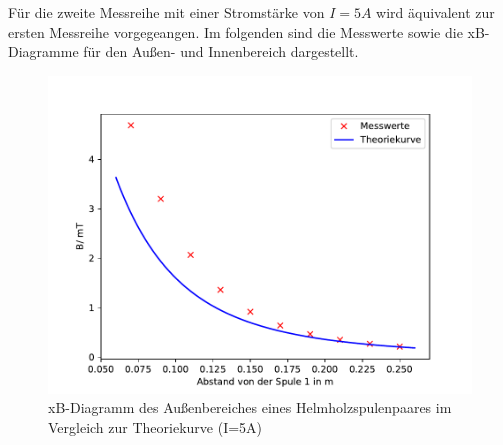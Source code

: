 \noindent Für die zweite Messreihe mit einer Stromstärke
von $I=5A$ wird äquivalent zur ersten Messreihe
vorgegeangen. Im folgenden sind die Messwerte sowie
die xB-Diagramme für den Außen- und Innenbereich
dargestellt.


\begin{figure}[H]
  \centering
  \includegraphics{Helmholz2.pdf}
  \caption{xB-Diagramm des Außenbereiches eines
  Helmholzspulenpaares im Vergleich zur Theoriekurve
  (I=5A)}
  \label{fig:Helmholz2}
\end{figure}


